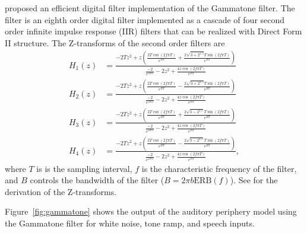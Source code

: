 \citet{slaney1993} proposed an efficient
digital filter implementation
of the Gammatone filter.
The filter is an eighth order
digital filter
implemented as a cascade of four
second order infinite impulse response (IIR) filters
that can be realized
with Direct Form II structure.
The Z-transforms of the
second order filters are
\begin{align*}
  H_1(z) &= \frac{-2 T z^2 + z \left(
            \frac{2 T \cos(2 f \pi T)}{e^{BT}}
            + \frac{2 \sqrt{3 + 2^{1.5}} T \sin(2 f \pi T)}{e^{BT}}
           \right)}
           {\frac{-2}{e^{2BT}} - 2 z^2
           + \frac{4 z \cos(2 f \pi T)}{e^{BT}}} \\
  H_2(z) &= \frac{-2 T z^2 + z \left(
            \frac{2 T \cos(2 f \pi T)}{e^{BT}}
            - \frac{2 \sqrt{3 + 2^{1.5}} T \sin(2 f \pi T)}{e^{BT}}
           \right)}
           {\frac{-2}{e^{2BT}} - 2 z^2
           + \frac{4 z \cos(2 f \pi T)}{e^{BT}}} \\
  H_3(z) &= \frac{-2 T z^2 + z \left(
            \frac{2 T \cos(2 f \pi T)}{e^{BT}}
            + \frac{2 \sqrt{3 - 2^{1.5}} T \sin(2 f \pi T)}{e^{BT}}
           \right)}
           {\frac{-2}{e^{2BT}} - 2 z^2
           + \frac{4 z \cos(2 f \pi T)}{e^{BT}}} \\
  H_4(z) &= \frac{-2 T z^2 + z \left(
            \frac{2 T \cos(2 f \pi T)}{e^{BT}}
            - \frac{2 \sqrt{3 - 2^{1.5}} T \sin(2 f \pi T)}{e^{BT}}
           \right)}
           {\frac{-2}{e^{2BT}} - 2 z^2
           + \frac{4 z \cos(2 f \pi T)}{e^{BT}}},
\end{align*}
where $T$ is is the sampling interval,
$f$ is the characteristic frequency of the filter,
and $B$ controls the bandwidth of the filter
($B = 2 \pi b \text{ERB}(f)$).
See \citet{slaney1993} for the derivation
of the Z-transforms.

Figure~\ref{fig:gammatone} shows the output
of the auditory periphery model
using the Gammatone filter
for white noise, tone ramp, and speech inputs.


